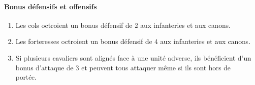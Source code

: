 		\paragraph{Bonus défensifs et offensifs}
		\begin{enumerate}
		\item Les cols octroient un bonus défensif de 2 aux infanteries et aux canons.
		\item Les forteresses octroient un bonus défensif de 4 aux infanteries et aux canons.
		\item Si plusieurs cavaliers sont alignés face à une unité adverse, ils bénéficient d'un bonus d'attaque de 3 et peuvent tous attaquer même si ils sont hors de portée.
		\end{enumerate}
		
		\clearpage

